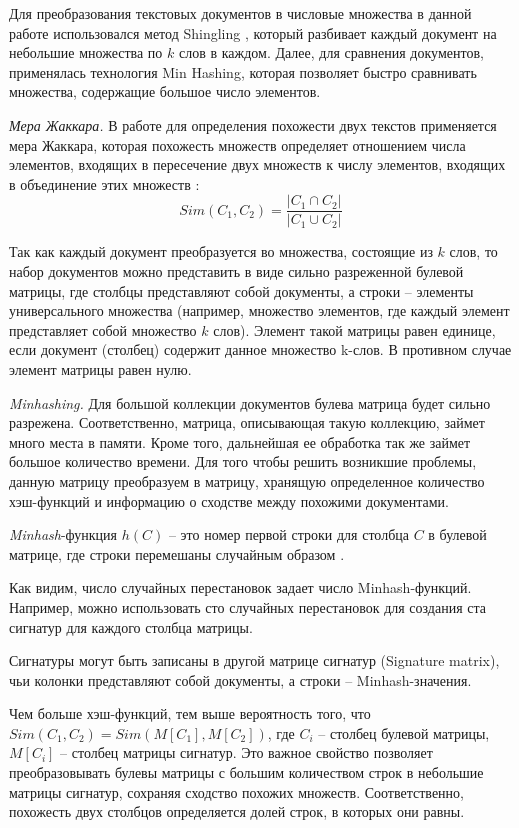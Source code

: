 Для преобразования текстовых документов в числовые множества в данной работе использовался метод Shingling \cite{Broder}, который разбивает каждый документ на небольшие множества по \(k\) слов в каждом. Далее, для сравнения документов, применялась технология Min Hashing, которая позволяет быстро сравнивать множества, содержащие большое число элементов.

\textit{Мера Жаккара.} В работе для определения похожести двух текстов применяется мера Жаккара, которая похожесть множеств определяет отношением числа элементов, входящих в пересечение двух множеств к числу элементов, входящих в объединение этих множеств \cite{SingthongchaiNiwattanakul}:
\[
\textit{Sim}(C_1, C_2) = \frac{\lvert C_1 \cap C_2\rvert}{\lvert C_1 \cup C_2\rvert}
\]

Так как каждый документ преобразуется во множества, состоящие из \(k\) слов, то набор документов можно представить в виде сильно разреженной булевой матрицы, где столбцы представляют собой документы, а строки -- элементы универсального множества (например, множество элементов, где каждый элемент представляет собой множество \(k\) слов). Элемент такой матрицы равен единице, если документ (столбец) содержит данное множество k-слов. В противном случае элемент матрицы равен нулю.

\textit{Minhashing.} Для большой коллекции документов булева матрица будет сильно разрежена. Соответственно, матрица, описывающая такую коллекцию, займет много места в памяти. Кроме того, дальнейшая ее обработка так же займет большое количество времени. Для того чтобы решить возникшие проблемы, данную матрицу преобразуем в матрицу, хранящую определенное количество хэш-функций и информацию о сходстве между похожими документами.

\textit{Minhash}-функция \(h(C)\) -- это номер первой строки для столбца \(C\) в булевой матрице, где строки перемешаны случайным образом \cite{ChumPerdochMatas}.

Как видим, число случайных перестановок задает число Minhash-функций. Например, можно использовать сто случайных перестановок для создания ста сигнатур для каждого столбца матрицы.

Сигнатуры могут быть записаны в другой матрице сигнатур (Signature matrix), чьи колонки представляют собой документы, а строки -- Minhash-значения.

Чем больше хэш-функций, тем выше вероятность того, что \(\textit{Sim}(C_1, C_2) = \textit{Sim}(M[C_1], M[C_2])\), где \(C_i\) -- столбец булевой матрицы, \(M[C_i]\) -- столбец матрицы сигнатур. Это важное свойство позволяет преобразовывать булевы матрицы с большим количеством строк в небольшие матрицы сигнатур, сохраняя сходство похожих множеств. Соответственно, похожесть двух столбцов определяется долей строк, в которых они равны.

